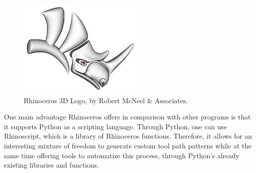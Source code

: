 	\begin{figure}[H]
		\centering
		\captionsetup{justification=centering}
		\includegraphics[width=0.4\linewidth]{Cap2/CAxSoftwares/Rhinoceros3D-logo.png}
		\caption{Rhinoceros 3D Logo, by Robert McNeel \& Associates.}
		\label{fig:Rhinoceros3D-logo}
	\end{figure}
	
	One main advantage Rhinoceros offers in comparison with other programs is that it supports Python as a scripting language. Through Python, one can use Rhinoscript, which is a library of Rhinoceros functions. Therefore, it allows for an interesting mixture of freedom to generate custom tool path patterns while at the same time offering tools to automatize this process, through Python's already existing libraries and functions.